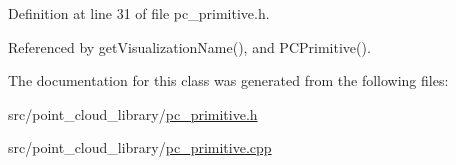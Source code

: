 Definition at line 31 of file pc\-\_\-primitive.\-h.



Referenced by get\-Visualization\-Name(), and P\-C\-Primitive().



The documentation for this class was generated from the following files\-:\begin{DoxyCompactItemize}
\item 
src/point\-\_\-cloud\-\_\-library/\hyperlink{pc__primitive_8h}{pc\-\_\-primitive.\-h}\item 
src/point\-\_\-cloud\-\_\-library/\hyperlink{pc__primitive_8cpp}{pc\-\_\-primitive.\-cpp}\end{DoxyCompactItemize}
